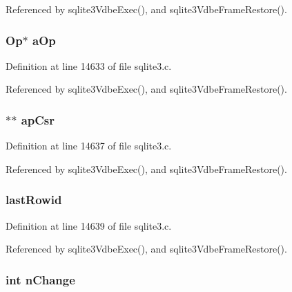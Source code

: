 Referenced by sqlite3\+Vdbe\+Exec(), and sqlite3\+Vdbe\+Frame\+Restore().

\hypertarget{struct_vdbe_frame_a174225cf156b2753600dd11eefc2c992}{}
\subsubsection[{a\+Op}]{\setlength{\rightskip}{0pt plus 5cm}Op$\ast$ a\+Op}\label{struct_vdbe_frame_a174225cf156b2753600dd11eefc2c992}


Definition at line 14633 of file sqlite3.\+c.



Referenced by sqlite3\+Vdbe\+Exec(), and sqlite3\+Vdbe\+Frame\+Restore().

\hypertarget{struct_vdbe_frame_ac1dd9d69a090bcc1bdb7afa3b0525eea}{}
\subsubsection[{ap\+Csr}]{$\ast$$\ast$ ap\+Csr}\label{struct_vdbe_frame_ac1dd9d69a090bcc1bdb7afa3b0525eea}


Definition at line 14637 of file sqlite3.\+c.



Referenced by sqlite3\+Vdbe\+Exec(), and sqlite3\+Vdbe\+Frame\+Restore().

\hypertarget{struct_vdbe_frame_ac7e3735a03635ad8ee39c159a889a920}{}
\subsubsection[{last\+Rowid}]{ last\+Rowid}\label{struct_vdbe_frame_ac7e3735a03635ad8ee39c159a889a920}


Definition at line 14639 of file sqlite3.\+c.



Referenced by sqlite3\+Vdbe\+Exec(), and sqlite3\+Vdbe\+Frame\+Restore().

\hypertarget{struct_vdbe_frame_a34a2d05071fd1eb026579e78343912a4}{}
\subsubsection[{n\+Change}]{\setlength{\rightskip}{0pt plus 5cm}int n\+Change}\label{struct_vdbe_frame_a34a2d05071fd1eb026579e78343912a4}


